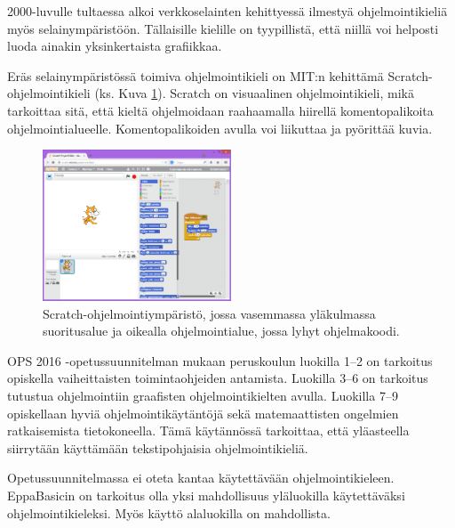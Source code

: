 2000-luvulle tultaessa alkoi
verkkoselainten kehittyessä
ilmestyä ohjelmointikieliä
myös selainympäristöön.
Tällaisille kielille on tyypillistä,
että niillä voi helposti luoda
ainakin yksinkertaista grafiikkaa.

Eräs selainympäristössä toimiva
ohjelmointikieli on
MIT:n kehittämä
Scratch-ohjelmoin\-ti\-kieli
\cite{scratch}
(ks. Kuva \ref{img:scratch}).
Scratch on visuaalinen ohjelmointikieli,
mikä tarkoittaa sitä, että
kieltä ohjelmoidaan raahaamalla
hiirellä komentopalikoita
ohjelmointialueelle.
Komentopalikoiden avulla
voi liikuttaa ja pyörittää
kuvia.

\begin{figure}[h]
    \centering
    \includegraphics[width=0.5\textwidth]{scratch}
    \caption{Scratch-ohjelmointiympäristö, jossa vasemmassa yläkulmassa suoritusalue ja oikealla ohjelmointialue, jossa lyhyt ohjelmakoodi.}
    \label{img:scratch}
\end{figure}

OPS 2016 -opetussuunnitelman
mukaan peruskoulun luokilla
1--2 on tarkoitus opiskella
vaiheittaisten toimintaohjeiden
antamista.
Luokilla 3--6 on tarkoitus
tutustua ohjelmointiin
graafisten ohjelmointikielten
avulla.
Luokilla 7--9 opiskellaan
hyviä ohjelmointikäytäntöjä
sekä matemaattisten ongelmien
ratkaisemista tietokoneella.
\cite{OPS_2016}
Tämä käytännössä tarkoittaa,
että yläasteella siirrytään
käyttämään tekstipohjaisia
ohjelmointikieliä.

Opetussuunnitelmassa ei
oteta kantaa käytettävään
ohjelmointikieleen.
EppaBasicin on tarkoitus olla
yksi mahdollisuus yläluokilla
käytettäväksi ohjelmointikieleksi.
Myös käyttö alaluokilla on
mahdollista.